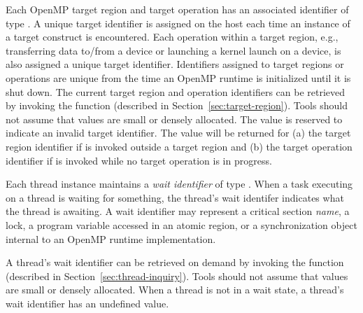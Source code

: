 Each OpenMP target region and target operation has an associated identifier of type . 
A unique target identifier is assigned on the host each time an instance of a target construct is encountered.
Each operation within a target region, e.g., transferring data to/from a device or launching a kernel launch 
on a device, is also assigned a unique target identifier. 
Identifiers assigned to target regions or operations 
are unique from the time an OpenMP runtime is initialized until it is shut down. 
The current target region and operation identifiers can be retrieved by invoking the  function (described in Section~\ref{sec:target-region}).
Tools should not assume that  values are small or densely allocated. 
The value  is reserved to indicate an invalid target identifier. 
The value  will be returned for (a) the target region identifier if  is invoked outside a target region and (b) the target operation identifier if  is invoked while no target operation is in progress.


Each thread instance maintains a {\em wait identifier} of type . 
When a task executing on a thread is waiting for something, the thread's wait identifer indicates what the thread is awaiting. 
A wait identifier may represent a critical section {\em name}, a lock,  a program variable accessed in an atomic region, or a synchronization object internal to an OpenMP runtime implementation. 
\begin{comment}
\begin{boxedcode}
typedef uint64\_t ompt\_wait\_id\_t;
\end{boxedcode}
\end{comment}
A thread's wait identifier can be retrieved on demand by invoking the  function (described in Section~\ref{sec:thread-inquiry}).
Tools should not assume that  values are small or densely allocated. 
When a thread is not in a wait state, a thread's wait identifier has an undefined value.
 
